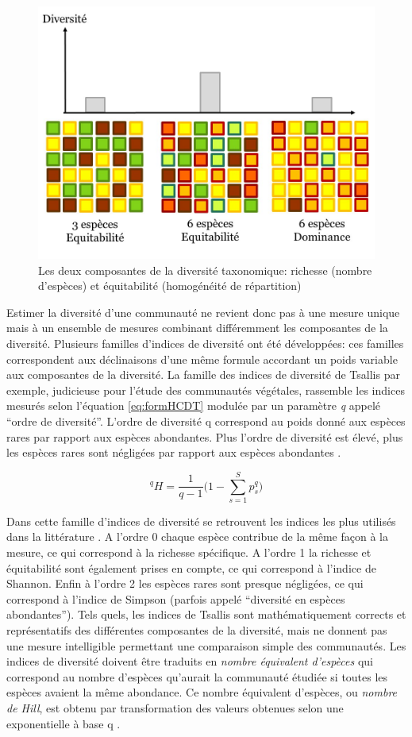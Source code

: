 \documentclass[
  11pt,
  french,
  A4paper,
  extrafontsizes,onecolumn,openright
  ]{memoir}
\begin{document}
\begin{figure}

{\centering \includegraphics[width=0.6\linewidth]{ExternalFig/Fig_RichnessEquitability} 

}

\caption{Les deux composantes de la diversité taxonomique: richesse (nombre d'espèces) et équitabilité (homogénéité de répartition)}\label{fig:RichEqu}
\end{figure}

Estimer la diversité d'une communauté ne revient donc pas à une mesure
unique mais à un ensemble de mesures combinant différemment les
composantes de la diversité. Plusieurs familles d'indices de diversité
ont été développées: ces familles correspondent aux déclinaisons d'une
même formule accordant un poids variable aux composantes de la
diversité. La famille des indices de diversité de Tsallis par exemple,
judicieuse pour l'étude des communautés végétales, rassemble les indices
mesurés selon l'équation \eqref{eq:formHCDT} modulée par un paramètre
\emph{q} appelé ``ordre de diversité''. L'ordre de diversité q
correspond au poids donné aux espèces rares par rapport aux espèces
abondantes. Plus l'ordre de diversité est élevé, plus les espèces rares
sont négligées par rapport aux espèces abondantes \autocite{Mendes2008}.

\begin{equation}
{^{q}H=\frac{1}{q-1}\Bigg(1-\displaystyle\sum_{s=1}^{S}p^q_s\Bigg) }
\label{eq:formHCDT}
\end{equation}

Dans cette famille d'indices de diversité se retrouvent les indices les
plus utilisés dans la littérature
\autocites{Shannon1948}{Simpson1949}{Patil1982}{Tothmeresz1995}. A
l'ordre 0 chaque espèce contribue de la même façon à la mesure, ce qui
correspond à la richesse spécifique. A l'ordre 1 la richesse et
équitabilité sont également prises en compte, ce qui correspond à
l'indice de Shannon. Enfin à l'ordre 2 les espèces rares sont presque
négligées, ce qui correspond à l'indice de Simpson (parfois appelé
``diversité en espèces abondantes''). Tels quels, les indices de Tsallis
sont mathématiquement corrects et représentatifs des différentes
composantes de la diversité, mais ne donnent pas une mesure intelligible
permettant une comparaison simple des communautés. Les indices de
diversité doivent être traduits en \emph{nombre équivalent d'espèces}
qui correspond au nombre d'espèces qu'aurait la communauté étudiée si
toutes les espèces avaient la même abondance. Ce nombre équivalent
d'espèces, ou \emph{nombre de Hill}, est obtenu par transformation des
valeurs obtenues selon une exponentielle à base q \autocite{Hill1973}.
\end{document}
